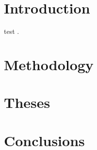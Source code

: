 \section{Introduction}

test \citep{Turkdogan1996}.

\section{Methodology}

\section{Theses}

\section{Conclusions}